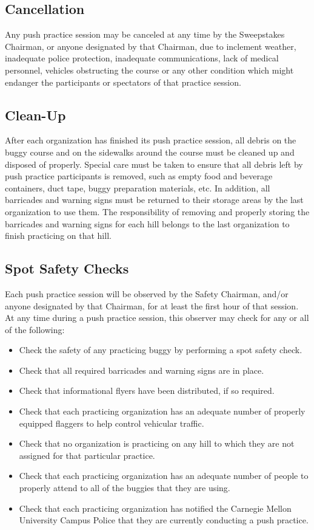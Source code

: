 \documentclass[openany]{book}
\begin{document}
\subsection{Cancellation}

Any push practice session may be canceled at any time by the Sweepstakes Chairman, or anyone designated by that Chairman, due to inclement weather, inadequate police protection, inadequate communications, lack of medical personnel, vehicles obstructing the course or any other condition which might endanger the participants or spectators of that practice session.

\subsection{Clean-Up}

After each organization has finished its push practice session, all debris on the buggy course and on the sidewalks around the course must be cleaned up and disposed of properly. Special care must be taken to ensure that all debris left by push practice participants is removed, such as empty food and beverage containers, duct tape, buggy preparation materials, etc. In addition, all barricades and warning signs must be returned to their storage areas by the last organization to use them. The responsibility of removing and properly storing the barricades and warning signs for each hill belongs to the last organization to finish practicing on that hill.

\subsection{Spot Safety Checks}

Each push practice session will be observed by the Safety Chairman, and/or anyone designated by that Chairman, for at least the first hour of that session. At any time during a push practice session, this observer may check for any or all of the following:
\begin{itemize}
	\item Check the safety of any practicing buggy by performing a spot safety check.
	\item Check that all required barricades and warning signs are in place.
	\item Check that informational flyers have been distributed, if so required.
	\item Check that each practicing organization has an adequate number of properly equipped flaggers to help control vehicular traffic.
	\item Check that no organization is practicing on any hill to which they are not assigned for that particular practice.
	\item Check that each practicing organization has an adequate number of people to properly attend to all of the buggies that they are using.
	\item Check that each practicing organization has notified the Carnegie Mellon University Campus Police that they are currently conducting a push practice.
\end{itemize}
\end{document}
